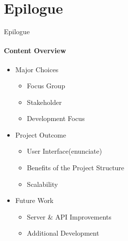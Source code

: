 \author{Marc4Prez}
\section{Epilogue}
    \begin{frame}[t]{Epilogue}\framesubtitle{Content Overview}
        \begin{itemize}
            \item Major Choices
            \begin{itemize}
                    \item Focus Group
                    \item Stakeholder 
                    \item Development Focus
            \end{itemize}
            \item Project Outcome
                \begin{itemize}
                    \item User Interface(enunciate)
                    \item Benefits of the Project Structure 
                    \item Scalability
                \end{itemize}
            \item Future Work
            \begin{itemize}
                \item Server \& API Improvements
                \item Additional Development
            \end{itemize}
        \end{itemize}
    \end{frame}

